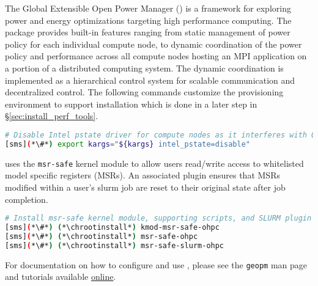 The Global Extensible Open Power Manager (\GEOPM{}) is a framework for
exploring power and energy optimizations targeting high performance computing.
The \GEOPM{} package provides built-in features ranging from static management
of power policy for each individual compute node, to dynamic coordination of
the power policy and performance across all compute nodes hosting an MPI
application on a portion of a distributed computing system.  The dynamic
coordination is implemented as a hierarchical control system for scalable
communication and decentralized control. The following commands customize the
provisioning environment to support \GEOPM{} installation which is done in a
later step in \S\ref{sec:install_perf_tools}.

\begin{lstlisting}[language=bash,keywords={},upquote=true]
# Disable Intel pstate driver for compute nodes as it interferes with GEOPM's operation.
[sms](*\#*) export kargs="${kargs} intel_pstate=disable"
\end{lstlisting}

\noindent \GEOPM{} uses the \texttt{msr-safe} kernel module
to allow users read/write access to whitelisted model specific
registers (MSRs).  An associated \SLURM{} plugin ensures that MSRs modified
within a user's slurm job are reset to their original state after job completion.

\begin{lstlisting}[language=bash,keywords={},upquote=true]
# Install msr-safe kernel module, supporting scripts, and SLURM plugin
[sms](*\#*) (*\chrootinstall*) kmod-msr-safe-ohpc
[sms](*\#*) (*\chrootinstall*) msr-safe-ohpc
[sms](*\#*) (*\chrootinstall*) msr-safe-slurm-ohpc
\end{lstlisting}

\noindent For documentation on how to configure and use \GEOPM{}, please see
the \texttt{geopm} man page and tutorials
available \href{https://github.com/geopm/geopm/tree/dev/tutorial}{online}.

